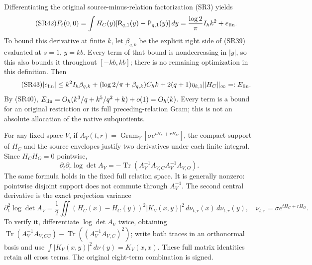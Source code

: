 \documentclass[11pt]{article}
\newcommand{\dd}{\,d}\newcommand{\Tr}{\operatorname{Tr}}
\newcommand{\Gram}{\operatorname{Gram}}\newcommand{\rank}{\operatorname{rank}}
\begin{document}
Differentiating the original source-minus-relation factorization (SR3) yields
\begin{equation}\tag{SR42}
 F_t(0,0)=\int H_C(y)
 [\mathsf R_{q,1}(y)-\mathsf P_{q,1}(y)]\dd y
 =\frac{\log2}{\pi}I_hk^2+e_{\rm lin}.
\end{equation}
To bound this derivative at finite $k$, let $\beta_{q,k}$ be the explicit
right side of (SR39) evaluated at $s=1$, $y=kb$. Every term of that bound is
nondecreasing in $|y|$, so this also bounds it throughout $[-kb,kb]$; there
is no remaining optimization in this definition. Then
\begin{equation}\tag{SR43}
 |e_{\rm lin}|\le
 k^2I_h\beta_{q,k}
 +(\log2/\pi+\beta_{q,k})C_hk
 +2(q+1)\eta_{k,1}\|H_C\|_\infty=:E_{\rm lin}.
\end{equation}
By (SR40), $E_{\rm lin}=O_h(k^3/q+k^5/q^2+k)+o(1)=O_h(k)$.
Every term is a bound for an original restriction or its full preceding-relation
Gram; this is not an absolute allocation of the native subquotients.

For any fixed space $V$, if $A_V(t,r)=\Gram_V[\sigma e^{tH_C+rH_O}]$,
the compact support of $H_C$ and the source envelopes justify two derivatives
under each finite integral. Since $H_CH_O=0$ pointwise,
\begin{equation}\tag{SR44}
 \partial_t\partial_r\log\det A_V
 =-\Tr(A_V^{-1}A_{V,C}A_V^{-1}A_{V,O}).
\end{equation}
The same formula holds in the fixed full relation space. It is generally
nonzero: pointwise disjoint support does not commute through $A_V^{-1}$.
The second central derivative is the exact projection variance
\begin{equation}\tag{SR45}
 \partial_t^2\log\det A_V
 =\frac12\iint(H_C(x)-H_C(y))^2|K_V(x,y)|^2
 \dd\nu_{t,r}(x)\dd\nu_{t,r}(y),\quad
 \nu_{t,r}=\sigma e^{tH_C+rH_O}.
\end{equation}
To verify it, differentiate $\log\det A_V$ twice, obtaining
$\Tr(A_V^{-1}A_{V,CC})-\Tr((A_V^{-1}A_{V,C})^2)$;
write both traces in an orthonormal basis and use
$\int|K_V(x,y)|^2\dd\nu(y)=K_V(x,x)$. These full matrix identities retain
all cross terms. The original eight-term combination is signed.
\end{document}
